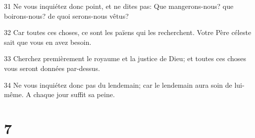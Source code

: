 \par 31 Ne vous inquiétez donc point, et ne dites pas: Que mangerons-nous? que boirons-nous? de quoi serons-nous vêtus?
\par 32 Car toutes ces choses, ce sont les païens qui les recherchent. Votre Père céleste sait que vous en avez besoin.
\par 33 Cherchez premièrement le royaume et la justice de Dieu; et toutes ces choses vous seront données par-dessus.
\par 34 Ne vous inquiétez donc pas du lendemain; car le lendemain aura soin de lui-même. A chaque jour suffit sa peine.

\chapter{7}

